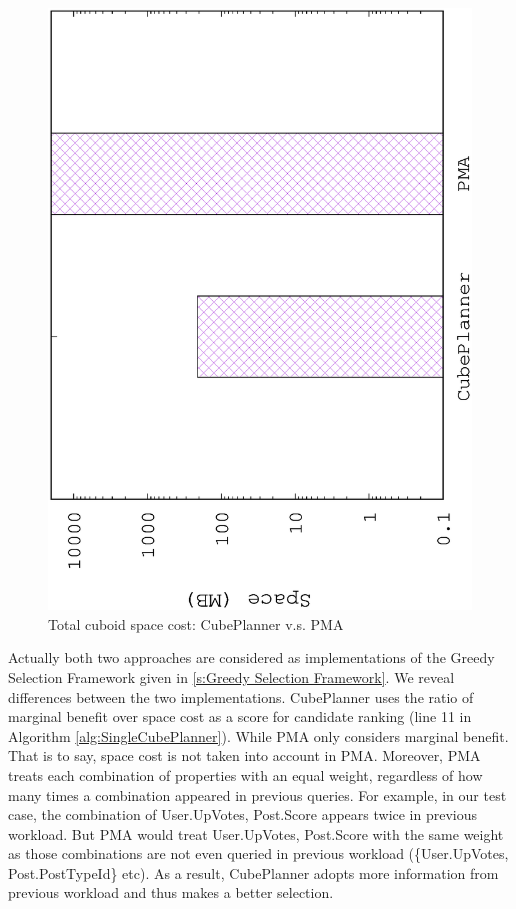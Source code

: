 \begin{figure}[H]
	\centering
	\includegraphics[scale=0.5, angle=270]{plot/jiaweispace.eps}
	\caption{Total cuboid space cost: CubePlanner v.s. PMA}
	\label{fig:jiaweispace}
\end{figure}

Actually both two approaches are considered as implementations of the Greedy Selection Framework given in \ref{s:Greedy Selection Framework}. We reveal differences between the two implementations. CubePlanner uses the ratio of marginal benefit over space cost as a score for candidate ranking (line 11 in Algorithm \ref{alg:SingleCubePlanner}). While PMA only considers marginal benefit. That is to say, space cost is not taken into account in PMA. Moreover, PMA treats each combination of properties with an equal weight, regardless of how many times a combination appeared in previous queries. For example, in our test case, the combination of {User.UpVotes, Post.Score} appears twice in previous workload. But PMA would treat {User.UpVotes, Post.Score} with the same weight as those combinations are not even queried in previous workload (\{User.UpVotes, Post.PostTypeId\} etc). As a result, CubePlanner adopts more information from previous workload and thus makes a better selection. 

